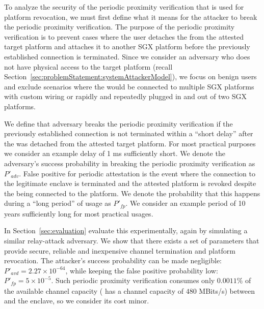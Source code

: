 To analyze the security of the periodic proximity verification that is used for platform revocation, we must first define what it means for the attacker to break the periodic proximity verification. The purpose of the periodic proximity verification is to prevent cases where the user detaches the \device from the attested target platform and attaches it to another SGX platform before the previously established connection is terminated. Since we consider an adversary who does not have physical access to the target platform (recall Section~\ref{sec:problemStatement:systemAttackerModel}), we focus on benign users and exclude scenarios where the \device would be connected to multiple SGX platforms with custom wiring or rapidly and repeatedly plugged in and out of two SGX platforms.


We define that adversary breaks the periodic proximity verification if the previously established connection is not terminated within a ``short delay'' after the \device was detached from the attested target platform. For most practical purposes we consider an example delay of 1 ms sufficiently short. We denote the adversary's success probability in breaking the periodic proximity verification as $P'_{adv}$.
%
False positive for periodic attestation is the event where the connection to the legitimate enclave is terminated and the attested platform is revoked despite the \device being connected to the platform. We denote the probability that this happens during a ``long period'' of usage as $P'_{fp}$. We consider an example period of 10 years sufficiently long for most practical usages.

In Section~\ref{sec:evaluation} evaluate this experimentally, again by simulating a similar relay-attack adversary. We show that there exists a set of parameters that provide secure, reliable and inexpensive channel termination and platform revocation. %
The attacker's success probability can be made negligible: $P'_{avd}=2.27\times10^{-64}$, while keeping the false positive probability low: $P'_{fp}=5\times10^{-5}$. Such periodic proximity verification consumes only $0.0011\%$ of the available channel capacity ( has a channel capacity of $480$ MBits/s) between \device and the enclave, so we consider its cost minor.


